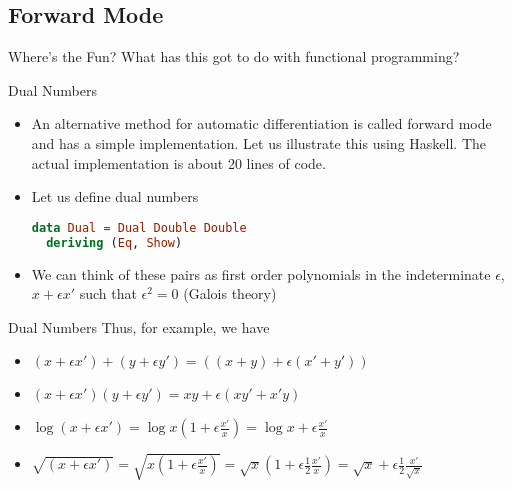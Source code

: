 \documentclass{beamer}
\begin{document}
\subsection{Forward Mode}

\begin{frame}[fragile]{Where's the Fun?}
What has this got to do with functional programming?
\end{frame}

\begin{frame}[fragile]{Dual Numbers}
\begin{itemize}
\item
An alternative method for automatic differentiation is called forward
mode and has a simple implementation. Let us illustrate this using
Haskell. The actual implementation is about 20 lines of code.
\pause
\item
Let us define dual numbers

\begin{lstlisting}[language=Haskell]
data Dual = Dual Double Double
  deriving (Eq, Show)
\end{lstlisting}
\pause
\item
We can think of these pairs as first order polynomials in the
indeterminate $\epsilon$, $x + \epsilon x'$ such that $\epsilon^2 = 0$
(Galois theory)
\end{itemize}
\end{frame}

\begin{frame}[fragile]{Dual Numbers}
Thus, for example, we have

\begin{itemize}
\pause
\item $(x + \epsilon x') + (y + \epsilon y') = ((x + y) + \epsilon (x' + y'))$
\pause
\item $(x + \epsilon x')(y + \epsilon y') = xy + \epsilon (xy' + x'y)$
\pause
\item $\log (x + \epsilon x') = \log x (1 + \epsilon \frac {x'}{x}) =
  \log x + \epsilon\frac{x'}{x}$
\pause
\item $\sqrt{(x + \epsilon x')} = \sqrt{x(1 + \epsilon\frac{x'}{x})} =
  \sqrt{x}(1 + \epsilon\frac{1}{2}\frac{x'}{x}) = \sqrt{x} +
  \epsilon\frac{1}{2}\frac{x'}{\sqrt{x}}$
\end{itemize}
\end{frame}
\end{document}
